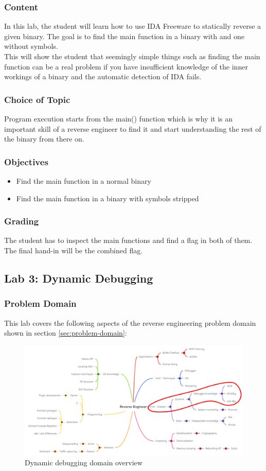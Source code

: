 \subsubsection*{Content}
In this lab, the student will learn how to use IDA Freeware to statically reverse a given binary. The goal is to find the main function in a binary with and one without symbols. \\
This will show the student that seemingly simple things such as finding the main function can be a real problem if you have insufficient knowledge of the inner workings of a binary and the automatic detection of IDA fails.
\subsubsection*{Choice of Topic}
Program execution starts from the main() function which is why it is an important skill of a reverse engineer to find it and start understanding the rest of the binary from there on.
\subsubsection*{Objectives}
\begin{itemize}
    \item Find the main function in a normal binary
    \item Find the main function in a binary with symbols stripped
\end{itemize}
\subsubsection*{Grading}
The student has to inspect the main functions and find a flag in both of them. The final hand-in will be the combined flag.
\pagebreak

\subsection{Lab 3: Dynamic Debugging}
\subsubsection*{Problem Domain}
This lab covers the following aspects of the reverse engineering problem domain shown in section \ref{sec:problem-domain}:
\vspace{-2ex}
\begin{figure}[H]
    \includegraphics[width=\textwidth]{resources/dynamic-overview-light.png}
    \caption{Dynamic debugging domain overview}
    \label{fig:dynamic-overview}
\end{figure}
